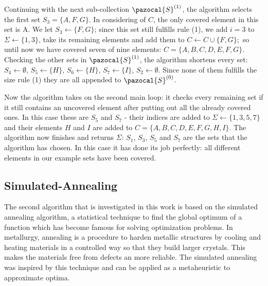 \documentclass[a4paper]{article}
\newcommand{\Sa}{\pazocal{S}}
\begin{document}
Continuing with the next sub-collection $\Sa^{(1)}$, the algorithm selects the first set $S_3 = \{A,F,G\}$. In considering of $C$, the only covered element in this set is A. We let $S_3 \xleftarrow{} \{F,G\}$; since this set still fulfills rule (1), we add $i=3$ to $\Sigma \xleftarrow{} \{1,3\}$, take its remaining elements and add them to \newline $C \xleftarrow{} C \cup \{F,G\};$ so until now we have covered seven of nine elements: $C = \{A,B,C,D,E,F,G\}$. Checking the other sets in $\Sa^{(1)}$, the algorithm shortens every set: $S_4 \xleftarrow{} \emptyset$, $S_5 \xleftarrow{} \{H\}$, $S_6 \xleftarrow{} \{H\}$, $S_7 \xleftarrow{} \{I\}$, $S_2 \xleftarrow{} \emptyset$. Since none of them fulfills the size rule (1) they are all appended to $\Sa^{(0)}$.

Now the algorithm takes on the second main loop: it checks every remaining set if it still contains an uncovered element after putting out all the already covered ones. In this case these are $S_5$ and $S_7$ - their indices are added to $\Sigma \xleftarrow{} \{1,3,5,7\}$ and their elements $H$ and $I$ are added to $C = \{A,B,C,D,E,F,G,H,I\}$. The algorithm now finishes and returns $\Sigma$:  $S_1$,  $S_3$, $S_5$ and $S_7$ are the sets that the algorithm has chosen. In this case it has done its job perfectly: all different elements in our example sets have been covered.




\subsection{Simulated-Annealing}
The second algorithm that is investigated in this work is based on the simulated annealing algorithm, a statistical technique to find the global optimum of a function which has become famous for solving optimization problems\cite{Jacobs1995,balas1980set,Kirkpatrick1983, vcerny1985thermodynamical}. In metallurgy, annealing is a procedure to harden metallic structures by cooling and heating materials in a controlled way so that they build larger crystals. This makes the materials free from defects an more reliable. The simulated annealing was inspired by this technique and can be applied as a metaheuristic to approximate optima. 
\end{document}
